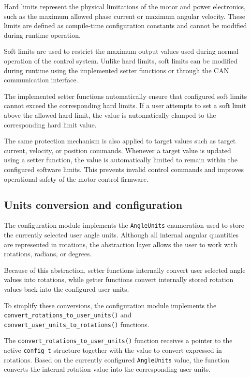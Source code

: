 Hard limits represent the physical limitations of the motor and power electronics,
such as the maximum allowed phase current or maximum angular velocity.
These limits are defined as compile-time configuration constants and cannot be modified during runtime operation.

Soft limits are used to restrict the maximum output values used during normal operation of the control system.
Unlike hard limits, soft limits can be modified during runtime using the implemented setter functions or through the CAN communication interface.

The implemented setter functions automatically ensure that configured soft limits cannot exceed the corresponding hard limits.
If a user attempts to set a soft limit above the allowed hard limit,
the value is automatically clamped to the corresponding hard limit value.

The same protection mechanism is also applied to target values such as target current, velocity, or position commands.
Whenever a target value is updated using a setter function,
the value is automatically limited to remain within the configured software limits.
This prevents invalid control commands and improves operational safety of the motor control firmware.

\subsection{Units conversion and configuration}
The configuration module implements the \texttt{AngleUnits} enumeration used to store the currently selected user angle units.
Although all internal angular quantities are represented in rotations,
the abstraction layer allows the user to work with rotations, radians, or degrees.

Because of this abstraction, setter functions internally convert user selected angle values into rotations,
while getter functions convert internally stored rotation values back into the configured user units.

To simplify these conversions, the configuration module implements the\\
\texttt{convert\_rotations\_to\_user\_units()} and \texttt{convert\_user\_units\_to\_rotations()} functions.

The \texttt{convert\_rotations\_to\_user\_units()} function receives a pointer to the active \texttt{config\_t} structure
together with the value to convert expressed in rotations.
Based on the currently configured \texttt{AngleUnits} value,
the function converts the internal rotation value into the corresponding user units.

